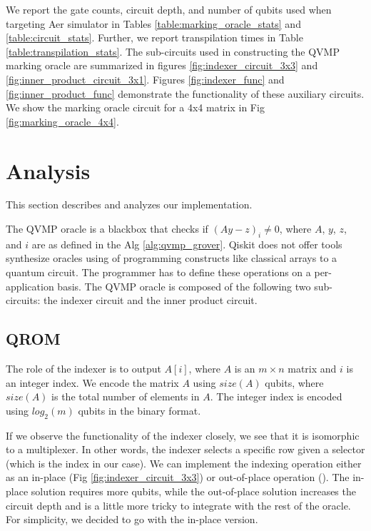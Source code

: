 \documentclass[11pt]{article}
\theoremstyle{definition}
\theoremstyle{remark}
\begin{document}
We report the gate counts, circuit depth, and number of qubits used when
targeting Aer simulator in Tables \ref{table:marking_oracle_stats} and
\ref{table:circuit_stats}. Further, we report transpilation times in Table
\ref{table:transpilation_stats}. The sub-circuits used in constructing the
QVMP marking oracle are summarized in figures
\ref{fig:indexer_circuit_3x3} and \ref{fig:inner_product_circuit_3x1}.
Figures \ref{fig:indexer_func} and \ref{fig:inner_product_func}
demonstrate the functionality of these auxiliary circuits. We show the
marking oracle circuit for a 4x4 matrix in Fig
\ref{fig:marking_oracle_4x4}.

\section{Analysis} \label{sec:analysis}

This section describes and analyzes our implementation.

The QVMP oracle is a blackbox that checks if $(Ay - z)_i \neq 0$, where $A$,
$y$, $z$, and $i$ are as defined in the Alg \ref{alg:qvmp_grover}. Qiskit does
not offer tools synthesize oracles using of programming constructs like classical arrays
to a quantum circuit. The programmer has to define these operations on a
per-application basis. The QVMP oracle is composed of the following two
sub-circuits: the indexer circuit and the inner product circuit.

\subsection{QROM}

The role of the indexer is to output $A[i]$, where $A$ is an $m \times n$
matrix and $i$ is an integer index. We encode the matrix $A$ using
$size(A)$ qubits, where $size(A)$ is the total number of elements in $A$.
The integer index is encoded using $log_2(m)$ qubits in the binary format.

If we observe the functionality of the indexer closely, we see that
it is isomorphic to a multiplexer. In other words, the indexer
selects a specific row given a selector (which is the index in our
case). We can implement the indexing operation either as an in-place
(Fig \ref{fig:indexer_circuit_3x3}) or out-of-place operation
(\cite{roy_synthesis_2012}). The in-place solution requires more qubits, while
the out-of-place solution increases the circuit depth and is a little more
tricky to integrate with the rest of the oracle. For simplicity, we decided to
go with the in-place version.
      
\end{document}

